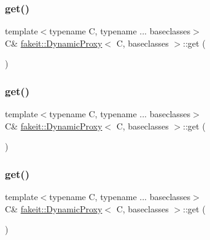 \subsubsection{\texorpdfstring{get()}{get()}\hspace{0.1cm}{\footnotesize\ttfamily [3/9]}}
{\footnotesize\ttfamily template$<$typename C, typename ... baseclasses$>$ \\
C\& \mbox{\hyperlink{structfakeit_1_1DynamicProxy}{fakeit\+::\+Dynamic\+Proxy}}$<$ C, baseclasses $>$\+::get (\begin{DoxyParamCaption}{ }\end{DoxyParamCaption})\hspace{0.3cm}{\ttfamily [inline]}}

\mbox{\label{structfakeit_1_1DynamicProxy_af8e4100c2d995a26bf3209e68c11d12a}} 
\subsubsection{\texorpdfstring{get()}{get()}\hspace{0.1cm}{\footnotesize\ttfamily [4/9]}}
{\footnotesize\ttfamily template$<$typename C, typename ... baseclasses$>$ \\
C\& \mbox{\hyperlink{structfakeit_1_1DynamicProxy}{fakeit\+::\+Dynamic\+Proxy}}$<$ C, baseclasses $>$\+::get (\begin{DoxyParamCaption}{ }\end{DoxyParamCaption})\hspace{0.3cm}{\ttfamily [inline]}}

\mbox{\label{structfakeit_1_1DynamicProxy_af8e4100c2d995a26bf3209e68c11d12a}} 
\subsubsection{\texorpdfstring{get()}{get()}\hspace{0.1cm}{\footnotesize\ttfamily [5/9]}}
{\footnotesize\ttfamily template$<$typename C, typename ... baseclasses$>$ \\
C\& \mbox{\hyperlink{structfakeit_1_1DynamicProxy}{fakeit\+::\+Dynamic\+Proxy}}$<$ C, baseclasses $>$\+::get (\begin{DoxyParamCaption}{ }\end{DoxyParamCaption})\hspace{0.3cm}{\ttfamily [inline]}}

